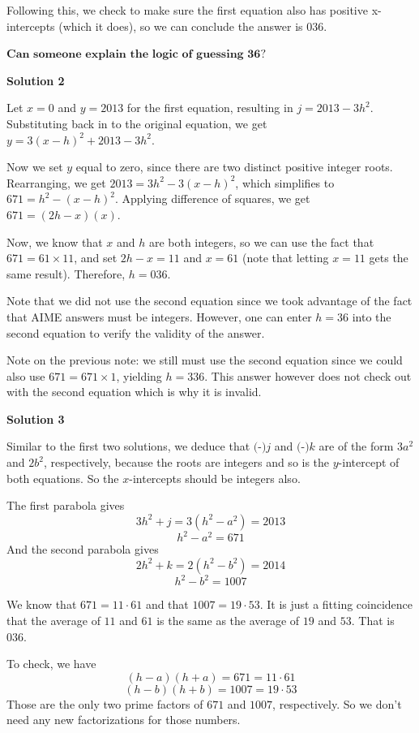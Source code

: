 \begin{enumerate}
 Following this, we check to make sure the first equation also has positive x-intercepts (which it does), so we can conclude the answer is $\boxed{036}$.

 
$\textbf{Can someone explain the logic of guessing 36?}$




\textbf{Solution 2}

Let $x=0$ and $y=2013$ for the first equation, resulting in $j=2013-3h^2$.  Substituting back in to the original equation, we get $y=3(x-h)^2+2013-3h^2$.

 Now we set $y$ equal to zero, since there are two distinct positive integer roots.  Rearranging, we get $2013=3h^2-3(x-h)^2$, which simplifies to $671=h^2-(x-h)^2$.  Applying difference of squares, we get $671=(2h-x)(x)$.

 Now, we know that $x$ and $h$ are both integers, so we can use the fact that $671=61\times11$, and set $2h-x=11$ and $x=61$ (note that letting $x=11$ gets the same result).  Therefore, $h=\boxed{036}$.

 Note that we did not use the second equation since we took advantage of the fact that AIME answers must be integers.  However, one can enter $h=36$ into the second equation to verify the validity of the answer. 

 Note on the previous note: we still must use the second equation since we could also use $671=671\times1$, yielding $h=336.$ This answer however does not check out with the second equation which is why it is invalid.

 



\textbf{Solution 3}

Similar to the first two solutions, we deduce that $\text{(-)}j$ and $\text{(-)}k$ are of the form $3a^2$ and $2b^2$, respectively, because the roots are integers and so is the $y$-intercept of both equations. So the $x$-intercepts should be integers also.

 The first parabola gives
 \[3h^2+j=3\left(h^2-a^2\right)=2013\]
 \[h^2-a^2=671\]And the second parabola gives
 \[2h^2+k=2\left(h^2-b^2\right)=2014\]
 \[h^2-b^2=1007\]

 We know that $671=11\cdot 61$ and that $1007=19\cdot 53$. It is just a fitting coincidence that the average of $11$ and $61$ is the same as the average of $19$ and $53$. That is $\boxed{036}$.

 To check, we have
 \[(h-a)(h+a)=671=11\cdot 61\]
 \[(h-b)(h+b)=1007=19\cdot 53\]Those are the only two prime factors of $671$ and $1007$, respectively. So we don't need any new factorizations for those numbers.


\end{enumerate}
